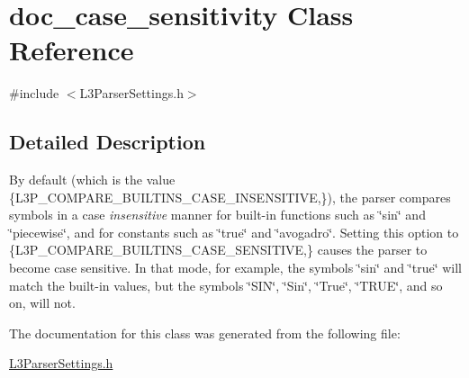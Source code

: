\hypertarget{classdoc__case__sensitivity}{}\section{doc\+\_\+case\+\_\+sensitivity Class Reference}
\label{classdoc__case__sensitivity}


{\ttfamily \#include $<$L3\+Parser\+Settings.\+h$>$}



\subsection{Detailed Description}
\begin{DoxyParagraph}{}
By default (which is the value \{L3\+P\+\_\+\+C\+O\+M\+P\+A\+R\+E\+\_\+\+B\+U\+I\+L\+T\+I\+N\+S\+\_\+\+C\+A\+S\+E\+\_\+\+I\+N\+S\+E\+N\+S\+I\+T\+I\+VE,\}), the parser compares symbols in a case {\itshape insensitive} manner for built-\/in functions such as {\ttfamily \char`\"{}sin\char`\"{}} and {\ttfamily \char`\"{}piecewise\char`\"{}}, and for constants such as {\ttfamily \char`\"{}true\char`\"{}} and {\ttfamily \char`\"{}avogadro\char`\"{}}. Setting this option to \{L3\+P\+\_\+\+C\+O\+M\+P\+A\+R\+E\+\_\+\+B\+U\+I\+L\+T\+I\+N\+S\+\_\+\+C\+A\+S\+E\+\_\+\+S\+E\+N\+S\+I\+T\+I\+VE,\} causes the parser to become case sensitive. In that mode, for example, the symbols {\ttfamily \char`\"{}sin\char`\"{}} and {\ttfamily \char`\"{}true\char`\"{}} will match the built-\/in values, but the symbols {\ttfamily \char`\"{}\+S\+I\+N\char`\"{}}, {\ttfamily \char`\"{}\+Sin\char`\"{}}, {\ttfamily \char`\"{}\+True\char`\"{}}, {\ttfamily \char`\"{}\+T\+R\+U\+E\char`\"{}}, and so on, will not. 
\end{DoxyParagraph}


The documentation for this class was generated from the following file\+:\begin{DoxyCompactItemize}
\item 
\hyperlink{_l3_parser_settings_8h}{L3\+Parser\+Settings.\+h}\end{DoxyCompactItemize}
